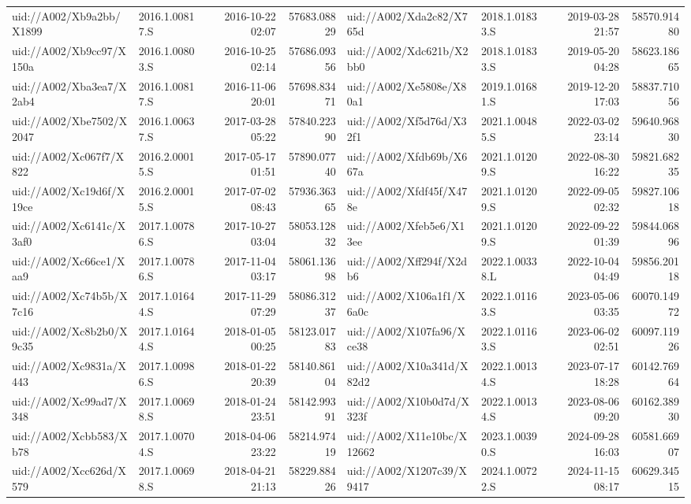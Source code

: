\documentclass{openjournal}
\begin{document}
\begin{table}
\begin{tabular}{@{}l l r r@{\hspace{18pt}}l l r r@{}}
uid://A002/Xb9a2bb/X1899 & 2016.1.00817.S & 2016-10-22 02:07 & 57683.08829 & uid://A002/Xda2c82/X765d & 2018.1.01833.S & 2019-03-28 21:57 & 58570.91480 \\
uid://A002/Xb9cc97/X150a & 2016.1.00803.S & 2016-10-25 02:14 & 57686.09356 & uid://A002/Xdc621b/X2bb0 & 2018.1.01833.S & 2019-05-20 04:28 & 58623.18665 \\
uid://A002/Xba3ea7/X2ab4 & 2016.1.00817.S & 2016-11-06 20:01 & 57698.83471 & uid://A002/Xe5808e/X80a1 & 2019.1.01681.S & 2019-12-20 17:03 & 58837.71056 \\
uid://A002/Xbe7502/X2047 & 2016.1.00637.S & 2017-03-28 05:22 & 57840.22390 & uid://A002/Xf5d76d/X32f1 & 2021.1.00485.S & 2022-03-02 23:14 & 59640.96830 \\
uid://A002/Xc067f7/X822 & 2016.2.00015.S & 2017-05-17 01:51 & 57890.07740 & uid://A002/Xfdb69b/X667a & 2021.1.01209.S & 2022-08-30 16:22 & 59821.68235 \\
uid://A002/Xc19d6f/X19ce & 2016.2.00015.S & 2017-07-02 08:43 & 57936.36365 & uid://A002/Xfdf45f/X478e & 2021.1.01209.S & 2022-09-05 02:32 & 59827.10618 \\
uid://A002/Xc6141c/X3af0 & 2017.1.00786.S & 2017-10-27 03:04 & 58053.12832 & uid://A002/Xfeb5e6/X13ee & 2021.1.01209.S & 2022-09-22 01:39 & 59844.06896 \\
uid://A002/Xc66ce1/Xaa9 & 2017.1.00786.S & 2017-11-04 03:17 & 58061.13698 & uid://A002/Xff294f/X2db6 & 2022.1.00338.L & 2022-10-04 04:49 & 59856.20118 \\
uid://A002/Xc74b5b/X7c16 & 2017.1.01644.S & 2017-11-29 07:29 & 58086.31237 & uid://A002/X106a1f1/X6a0c & 2022.1.01163.S & 2023-05-06 03:35 & 60070.14972 \\
uid://A002/Xc8b2b0/X9c35 & 2017.1.01644.S & 2018-01-05 00:25 & 58123.01783 & uid://A002/X107fa96/Xce38 & 2022.1.01163.S & 2023-06-02 02:51 & 60097.11926 \\
uid://A002/Xc9831a/X443 & 2017.1.00986.S & 2018-01-22 20:39 & 58140.86104 & uid://A002/X10a341d/X82d2 & 2022.1.00134.S & 2023-07-17 18:28 & 60142.76964 \\
uid://A002/Xc99ad7/X348 & 2017.1.00698.S & 2018-01-24 23:51 & 58142.99391 & uid://A002/X10b0d7d/X323f & 2022.1.00134.S & 2023-08-06 09:20 & 60162.38930 \\
uid://A002/Xcbb583/Xb78 & 2017.1.00704.S & 2018-04-06 23:22 & 58214.97419 & uid://A002/X11e10bc/X12662 & 2023.1.00390.S & 2024-09-28 16:03 & 60581.66907 \\
uid://A002/Xcc626d/X579 & 2017.1.00698.S & 2018-04-21 21:13 & 58229.88426 & uid://A002/X1207c39/X9417 & 2024.1.00722.S & 2024-11-15 08:17 & 60629.34515 \\

\end{tabular}
\end{table}
\end{document}
